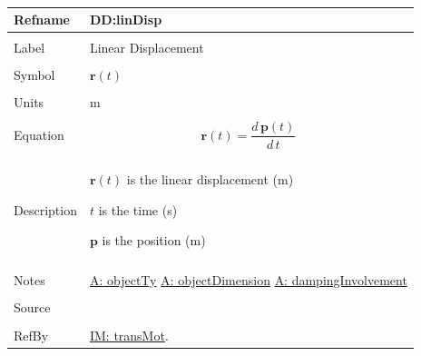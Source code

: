 \documentclass[12pt]{article}
\begin{document}
~\newline
\noindent \begin{minipage}{\textwidth}
\begin{tabular}{p{} p{}}
\toprule \textbf{Refname} & \textbf{DD:linDisp}
\label{DD:linDisp}
\\ \midrule \\
Label & Linear Displacement
\\ \midrule \\
Symbol & $\mathbf{r}(t)$
\\ \midrule \\
Units & m
\\ \midrule \\
Equation & \begin{dmath}
           \mathbf{r}(t)=\frac{d\,\mathbf{p}\left(t\right)}{d\,t}
           \end{dmath}
\\ \midrule \\
Description & \begin{symbDescription}
              \item{$\mathbf{r}(t)$ is the linear displacement (m)}
              \item{$t$ is the time (s)}
              \item{$\mathbf{p}$ is the position (m)}
              \end{symbDescription}
\\ \midrule \\
Notes & \hyperref[A:objectTy]{A: objectTy}
        \hyperref[A:objectDimension]{A: objectDimension}
        \hyperref[A:dampingInvolvement]{A: dampingInvolvement}
\\ \midrule \\
Source & 
\\ \midrule \\
RefBy & \hyperref[IM:transMot]{IM: transMot}.
\\ \bottomrule \end{tabular}
\end{minipage}\\
~\newline
\end{document}
